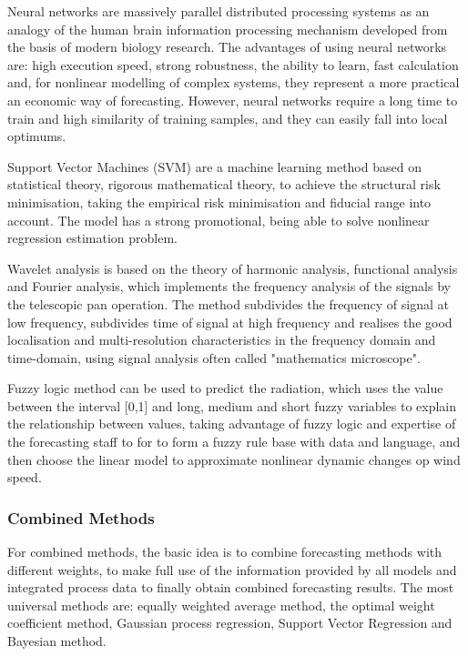 Neural networks are massively parallel distributed processing systems as an analogy of the human brain information processing mechanism developed from the basis of modern biology research. The advantages of using neural networks are: high execution speed, strong robustness, the ability to learn, fast calculation and, for nonlinear modelling of complex systems, they represent a more practical an economic way of forecasting. However, neural networks require a long time to train and high similarity of training samples, and they can easily fall into local optimums.

Support Vector Machines (SVM) are a machine learning method based on statistical theory, rigorous mathematical theory, to achieve the structural risk minimisation, taking the empirical risk minimisation and fiducial range into account. The model has a strong promotional, being able to solve nonlinear regression estimation problem.

Wavelet analysis is based on the theory of harmonic analysis, functional analysis and Fourier analysis, which implements the frequency analysis of the signals by the telescopic pan operation. The method subdivides the frequency of signal at low frequency, subdivides time of signal at high frequency and realises the good localisation and multi-resolution characteristics in the frequency domain and time-domain, using signal analysis often called "mathematics microscope".

Fuzzy logic method can be used to predict the radiation, which uses the value between the interval [0,1] and long, medium and short fuzzy variables to explain the relationship between values, taking advantage of fuzzy logic and expertise of the forecasting staff to for  to form a fuzzy rule base with data and language, and then choose the linear model to approximate nonlinear dynamic changes op wind speed.

\subsubsection{Combined Methods}

For combined methods, the basic idea is to combine forecasting methods with different weights, to make full use of the information provided by all models and integrated process data to finally obtain combined forecasting results. The most universal methods are: equally weighted average method, the optimal weight coefficient method, Gaussian process regression, Support Vector Regression and Bayesian method.

